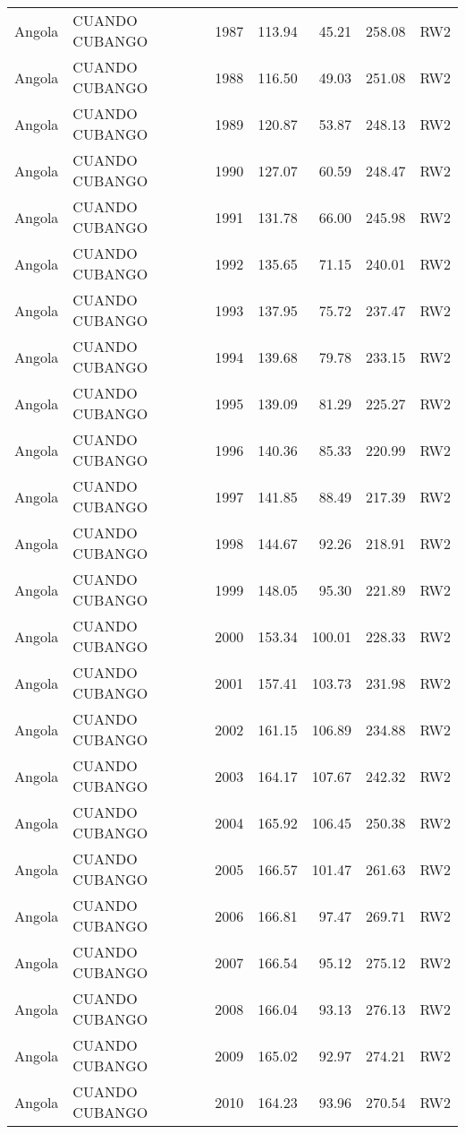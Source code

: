 \begin{longtable}{lllrrrl}
  Angola & CUANDO CUBANGO & 1987 & 113.94 & 45.21 & 258.08 & RW2 \\ 
  Angola & CUANDO CUBANGO & 1988 & 116.50 & 49.03 & 251.08 & RW2 \\ 
  Angola & CUANDO CUBANGO & 1989 & 120.87 & 53.87 & 248.13 & RW2 \\ 
  Angola & CUANDO CUBANGO & 1990 & 127.07 & 60.59 & 248.47 & RW2 \\ 
  Angola & CUANDO CUBANGO & 1991 & 131.78 & 66.00 & 245.98 & RW2 \\ 
  Angola & CUANDO CUBANGO & 1992 & 135.65 & 71.15 & 240.01 & RW2 \\ 
  Angola & CUANDO CUBANGO & 1993 & 137.95 & 75.72 & 237.47 & RW2 \\ 
  Angola & CUANDO CUBANGO & 1994 & 139.68 & 79.78 & 233.15 & RW2 \\ 
  Angola & CUANDO CUBANGO & 1995 & 139.09 & 81.29 & 225.27 & RW2 \\ 
  Angola & CUANDO CUBANGO & 1996 & 140.36 & 85.33 & 220.99 & RW2 \\ 
  Angola & CUANDO CUBANGO & 1997 & 141.85 & 88.49 & 217.39 & RW2 \\ 
  Angola & CUANDO CUBANGO & 1998 & 144.67 & 92.26 & 218.91 & RW2 \\ 
  Angola & CUANDO CUBANGO & 1999 & 148.05 & 95.30 & 221.89 & RW2 \\ 
  Angola & CUANDO CUBANGO & 2000 & 153.34 & 100.01 & 228.33 & RW2 \\ 
  Angola & CUANDO CUBANGO & 2001 & 157.41 & 103.73 & 231.98 & RW2 \\ 
  Angola & CUANDO CUBANGO & 2002 & 161.15 & 106.89 & 234.88 & RW2 \\ 
  Angola & CUANDO CUBANGO & 2003 & 164.17 & 107.67 & 242.32 & RW2 \\ 
  Angola & CUANDO CUBANGO & 2004 & 165.92 & 106.45 & 250.38 & RW2 \\ 
  Angola & CUANDO CUBANGO & 2005 & 166.57 & 101.47 & 261.63 & RW2 \\ 
  Angola & CUANDO CUBANGO & 2006 & 166.81 & 97.47 & 269.71 & RW2 \\ 
  Angola & CUANDO CUBANGO & 2007 & 166.54 & 95.12 & 275.12 & RW2 \\ 
  Angola & CUANDO CUBANGO & 2008 & 166.04 & 93.13 & 276.13 & RW2 \\ 
  Angola & CUANDO CUBANGO & 2009 & 165.02 & 92.97 & 274.21 & RW2 \\ 
  Angola & CUANDO CUBANGO & 2010 & 164.23 & 93.96 & 270.54 & RW2 \\ 

\end{longtable}
